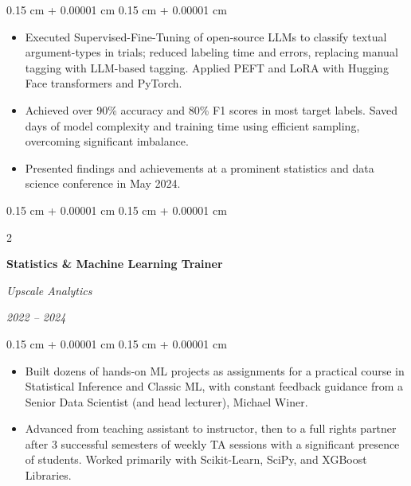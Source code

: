\documentclass[10pt, letterpaper]{article}
\newenvironment{highlights}{
    \begin{itemize}[
        topsep=0.08 cm,
        parsep=0.08 cm,
        partopsep=0pt,
        itemsep=0pt,
        leftmargin=0.25 cm + 10pt
    ]
}{
    \end{itemize}
} %
\newenvironment{onecolentry}{
    \begin{adjustwidth}{
        0.15 cm + 0.00001 cm
    }{
        0.15 cm + 0.00001 cm
    }
}{
    \end{adjustwidth}
} %
\newenvironment{twocolentry}[2][]{
    \onecolentry
    \def\secondColumn{#2}
    \setcolumnwidth{\fill, 4.5 cm}
    \begin{paracol}{2}
}{
    \switchcolumn \raggedleft \secondColumn
    \end{paracol}
    \endonecolentry
} %
\begin{document}
        \vspace{0.08 cm}
        \begin{onecolentry}
            \begin{highlights}
                \item Executed Supervised-Fine-Tuning of open-source LLMs to classify textual argument-types in trials; reduced labeling time and errors, replacing manual tagging with LLM-based tagging. Applied PEFT and LoRA with Hugging Face transformers and PyTorch.
                \item Achieved over 90\% accuracy and 80\% F1 scores in most target labels. Saved days of model complexity and training time using efficient sampling, overcoming significant imbalance.
                \item Presented findings and achievements at a prominent statistics and data science conference in May 2024.
            \end{highlights}
        \end{onecolentry}


        \vspace{0.15 cm}

        \begin{twocolentry}{
            
            
        \textit{2022 – 2024}}
            \textbf{Statistics \& Machine Learning Trainer}
            
            \textit{Upscale Analytics}
        \end{twocolentry}

        \vspace{0.08 cm}
        \begin{onecolentry}
            \begin{highlights}
                \item Built dozens of hands-on ML projects as assignments for a practical course in Statistical Inference and Classic ML, with constant feedback guidance from a Senior Data Scientist (and head lecturer), Michael Winer.
                \item Advanced from teaching assistant to instructor, then to a full rights partner after 3 successful semesters of weekly TA sessions with a significant presence of students. Worked primarily with Scikit-Learn, SciPy, and XGBoost Libraries.
            \end{highlights}
        \end{onecolentry}


        \vspace{0.15 cm}
\end{document}
